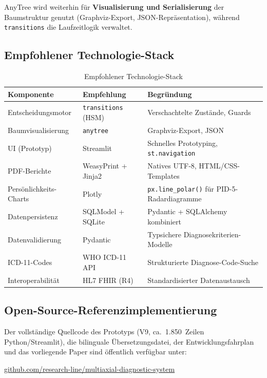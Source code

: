 \documentclass[11pt,a4paper]{article}
\begin{document}
AnyTree wird weiterhin f\"ur \textbf{Visualisierung und Serialisierung} der Baumstruktur genutzt (Graphviz-Export, JSON-Repr\"asentation), w\"ahrend \texttt{transitions} die Laufzeitlogik verwaltet.

\subsection{Empfohlener Technologie-Stack}

\begin{table}[H]
\centering
\caption{Empfohlener Technologie-Stack}
\label{tab:techstack}
\begin{tabularx}{\textwidth}{lXl}
\toprule
\textbf{Komponente} & \textbf{Empfehlung} & \textbf{Begr\"undung} \\
\midrule
Entscheidungsmotor & \texttt{transitions} (HSM) & Verschachtelte Zust\"ande, Guards \\
Baumvisualisierung & \texttt{anytree} & Graphviz-Export, JSON \\
UI (Prototyp) & Streamlit & Schnelles Prototyping, \texttt{st.navigation} \\
PDF-Berichte & WeasyPrint + Jinja2 & Natives UTF-8, HTML/CSS-Templates \\
Pers\"onlichkeits-Charts & Plotly & \texttt{px.line\_polar()} f\"ur PID-5-Radardiagramme \\
Datenpersistenz & SQLModel + SQLite & Pydantic + SQLAlchemy kombiniert \\
Datenvalidierung & Pydantic & Typsichere Diagnosekriterien-Modelle \\
ICD-11-Codes & WHO ICD-11 API & Strukturierte Diagnose-Code-Suche \\
Interoperabilit\"at & HL7 FHIR (R4) & Standardisierter Datenaustausch \\
\bottomrule
\end{tabularx}
\end{table}

\subsection{Open-Source-Referenzimplementierung}

Der vollst\"andige Quellcode des Prototyps (V9, ca.\ 1.850~Zeilen Python/Streamlit), die bilinguale \"Ubersetzungsdatei, der Entwicklungsfahrplan und das vorliegende Paper sind \"offentlich verf\"ugbar unter:

\begin{center}
\href{https://github.com/research-line/multiaxial-diagnostic-system}{github.com/research-line/multiaxial-diagnostic-system}
\end{center}
\end{document}
